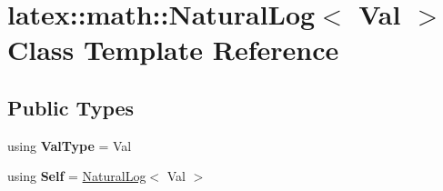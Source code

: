\hypertarget{classlatex_1_1math_1_1NaturalLog}{\section{latex\-:\-:math\-:\-:Natural\-Log$<$ Val $>$ Class Template Reference}
\label{classlatex_1_1math_1_1NaturalLog}
}
\subsection*{Public Types}
\begin{DoxyCompactItemize}
\item 
\hypertarget{classlatex_1_1math_1_1NaturalLog_a3c4e70fee11fb15ab7b15957fdad497d}{using {\bfseries Val\-Type} = Val}\label{classlatex_1_1math_1_1NaturalLog_a3c4e70fee11fb15ab7b15957fdad497d}

\item 
\hypertarget{classlatex_1_1math_1_1NaturalLog_a7a95f61ac1bac6dba31c940aeb81ba34}{using {\bfseries Self} = \hyperlink{classlatex_1_1math_1_1NaturalLog}{Natural\-Log}$<$ Val $>$}\label{classlatex_1_1math_1_1NaturalLog_a7a95f61ac1bac6dba31c940aeb81ba34}

\end{DoxyCompactItemize}

